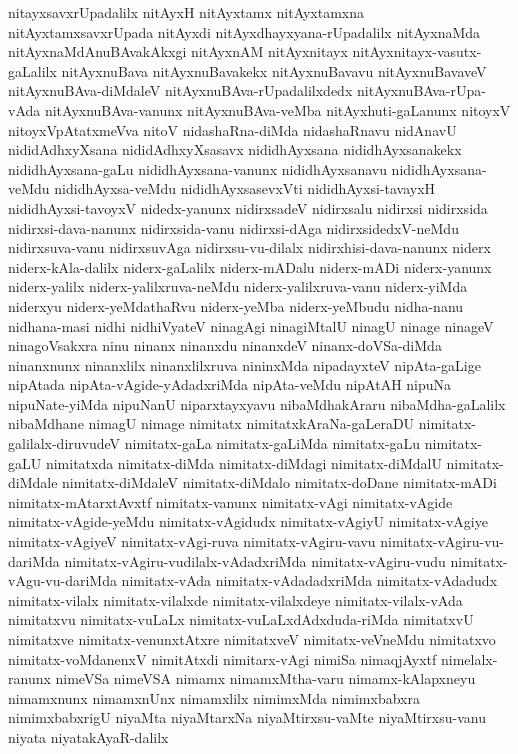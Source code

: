 {nitayxsavxrUpadalilx
nitAyxH
nitAyxtamx
nitAyxtamxna
nitAyxtamxsavxrUpada
nitAyxdi
nitAyxdhayxyana-rUpadalilx
nitAyxnaMda
nitAyxnaMdAnuBAvakAkxgi
nitAyxnAM
nitAyxnitayx
nitAyxnitayx-vasutx-gaLalilx
nitAyxnuBava
nitAyxnuBavakekx
nitAyxnuBavavu
nitAyxnuBavaveV
nitAyxnuBAva-diMdaleV
nitAyxnuBAva-rUpadalilxdedx
nitAyxnuBAva-rUpa-vAda
nitAyxnuBAva-vanunx
nitAyxnuBAva-veMba
nitAyxhuti-gaLanunx
nitoyxV
nitoyxVpAtatxmeVva
nitoV
nidashaRna-diMda
nidashaRnavu
nidAnavU
nididAdhxyXsana
nididAdhxyXsasavx
nididhAyxsana
nididhAyxsanakekx
nididhAyxsana-gaLu
nididhAyxsana-vanunx
nididhAyxsanavu
nididhAyxsana-veMdu
nididhAyxsa-veMdu
nididhAyxsasevxVti
nididhAyxsi-tavayxH
nididhAyxsi-tavoyxV
nidedx-yanunx
nidirxsadeV
nidirxsalu
nidirxsi
nidirxsida
nidirxsi-dava-nanunx
nidirxsida-vanu
nidirxsi-dAga
nidirxsidedxV-neMdu
nidirxsuva-vanu
nidirxsuvAga
nidirxsu-vu-dilalx
nidirxhisi-dava-nanunx
niderx
niderx-kAla-dalilx
niderx-gaLalilx
niderx-mADalu
niderx-mADi
niderx-yanunx
niderx-yalilx
niderx-yalilxruva-neMdu
niderx-yalilxruva-vanu
niderx-yiMda
niderxyu
niderx-yeMdathaRvu
niderx-yeMba
niderx-yeMbudu
nidha-nanu
nidhana-masi
nidhi
nidhiVyateV
ninagAgi
ninagiMtalU
ninagU
ninage
ninageV
ninagoVsakxra
ninu
ninanx
ninanxdu
ninanxdeV
ninanx-doVSa-diMda
ninanxnunx
ninanxlilx
ninanxlilxruva
nininxMda
nipadayxteV
nipAta-gaLige
nipAtada
nipAta-vAgide-yAdadxriMda
nipAta-veMdu
nipAtAH
nipuNa
nipuNate-yiMda
nipuNanU
niparxtayxyavu
nibaMdhakAraru
nibaMdha-gaLalilx
nibaMdhane
nimagU
nimage
nimitatx
nimitatxkAraNa-gaLeraDU
nimitatx-galilalx-diruvudeV
nimitatx-gaLa
nimitatx-gaLiMda
nimitatx-gaLu
nimitatx-gaLU
nimitatxda
nimitatx-diMda
nimitatx-diMdagi
nimitatx-diMdalU
nimitatx-diMdale
nimitatx-diMdaleV
nimitatx-diMdalo
nimitatx-doDane
nimitatx-mADi
nimitatx-mAtarxtAvxtf
nimitatx-vanunx
nimitatx-vAgi
nimitatx-vAgide
nimitatx-vAgide-yeMdu
nimitatx-vAgidudx
nimitatx-vAgiyU
nimitatx-vAgiye
nimitatx-vAgiyeV
nimitatx-vAgi-ruva
nimitatx-vAgiru-vavu
nimitatx-vAgiru-vu-dariMda
nimitatx-vAgiru-vudilalx-vAdadxriMda
nimitatx-vAgiru-vudu
nimitatx-vAgu-vu-dariMda
nimitatx-vAda
nimitatx-vAdadadxriMda
nimitatx-vAdadudx
nimitatx-vilalx
nimitatx-vilalxde
nimitatx-vilalxdeye
nimitatx-vilalx-vAda
nimitatxvu
nimitatx-vuLaLx
nimitatx-vuLaLxdAdxduda-riMda
nimitatxvU
nimitatxve
nimitatx-venunxtAtxre
nimitatxveV
nimitatx-veVneMdu
nimitatxvo
nimitatx-voMdanenxV
nimitAtxdi
nimitarx-vAgi
nimiSa
nimaqjAyxtf
nimelalx-ranunx
nimeVSa
nimeVSA
nimamx
nimamxMtha-varu
nimamx-kAlapxneyu
nimamxnunx
nimamxnUnx
nimamxlilx
nimimxMda
nimimxbabxra
nimimxbabxrigU
niyaMta
niyaMtarxNa
niyaMtirxsu-vaMte
niyaMtirxsu-vanu
niyata
niyatakAyaR-dalilx
}
